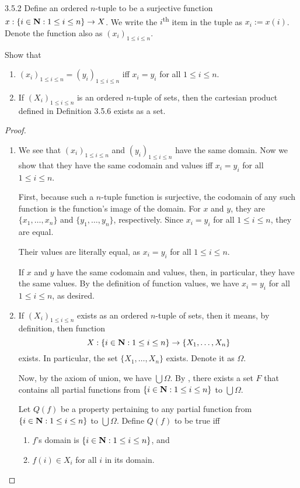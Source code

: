 \begin{exercise}{3.5.2}
	Define an ordered $n$-tuple to be a surjective function $x : \{i \in \mathbf{N} : 1 \le i \le n\} \to X$. We write the $i$\textsuperscript{th} item in the tuple as $x_i := x(i)$. Denote the function also as $(x_i)_{1 \le i \le n}$. 
	
	Show that 
	\begin{enumerate}
		\item $(x_i)_{1 \le i \le n} = (y_i)_{1 \le i \le n}$ iff $x_i = y_i$ for all $1 \le i \le n$.
		\item If $(X_i)_{1 \le i \le n}$ is an ordered $n$-tuple of sets, then the cartesian product defined in Definition 3.5.6 exists as a set.
	\end{enumerate}
\end{exercise}
\begin{proof}\leavevmode
	\begin{enumerate}
		\item We see that $(x_i)_{1 \le i \le n}$ and $(y_i)_{1 \le i \le n}$ have the same domain. Now we show that they have the same codomain and values iff $x_i = y_i$ for all $1 \le i \le n$.
		
		First, because such a $n$-tuple function is surjective, the codomain of any such function is the function's image of the domain. For $x$ and $y$, they are $\{x_1, \dots, x_n\}$ and $\{y_1, \dots, y_n\}$, respectively. Since $x_i = y_i$ for all $1 \le i \le n$, they are equal.
		
		Their values are literally equal, as $x_i = y_i$ for all $1 \le i \le n$.
		
		If $x$ and $y$ have the same codomain and values, then, in particular, they have the same values. By the definition of function values, we have $x_i = y_i$ for all $1 \le i \le n$, as desired.
		
		\item If $(X_i)_{1 \le i \le n}$ exists as an ordered $n$-tuple of sets, then it means, by definition, then function
		\[
			X : \{i \in \mathbf{N} : 1 \le i \le n\} \to \{X_1, \dots, X_n\}
		\]
		exists. In particular, the set $\{X_1, \dots, X_n\}$ exists. Denote it as $\Omega$.
		
		Now, by the axiom of union, we have $\bigcup \Omega$. By , there exists a set $F$ that contains all partial functions from $\{i \in \mathbf{N} : 1 \le i \le n\}$ to $\bigcup \Omega$.
		
		Let $Q(f)$ be a property pertaining to any partial function from $\{i \in \mathbf{N} : 1 \le i \le n\}$ to $\bigcup \Omega$. Define $Q(f)$ to be true iff
		\begin{enumerate}
			\item $f$'s domain is $\{i \in \mathbf{N} : 1 \le i \le n\}$, and
			\item $f(i) \in X_i$ for all $i$ in its domain. \label{exer.3.5.2.q.of.f.2}
		\end{enumerate}
	

\end{enumerate}
\end{proof}
